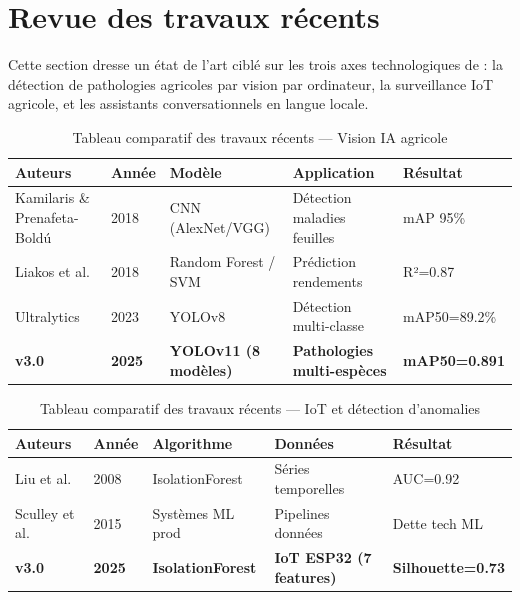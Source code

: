 \section{Revue des travaux récents}

Cette section dresse un état de l'art ciblé sur les trois axes technologiques de
\farmAI{} : la détection de pathologies agricoles par vision par ordinateur,
la surveillance IoT agricole, et les assistants conversationnels en langue locale.

\begin{table}[H]\centering
\caption{Tableau comparatif des travaux récents — Vision IA agricole}
\label{tab:art_vision}
\small
\begin{tabular}{p{3.5cm}p{2cm}p{2.5cm}p{3cm}p{2.5cm}}
\toprule
\textbf{Auteurs} & \textbf{Année} & \textbf{Modèle} & \textbf{Application} & \textbf{Résultat} \\
\midrule
Kamilaris \& Prenafeta-Boldú \cite{kamilaris2018deep} & 2018 & CNN (AlexNet/VGG) & Détection maladies feuilles & mAP 95\% \\
Liakos et al. \cite{liakos2018machine} & 2018 & Random Forest / SVM & Prédiction rendements & R²=0.87 \\
Ultralytics \cite{ultralytics2023yolov8} & 2023 & YOLOv8 & Détection multi-classe & mAP50=89.2\% \\
\textbf{\farmAI{} v3.0} & \textbf{2025} & \textbf{YOLOv11 (8 modèles)} & \textbf{Pathologies multi-espèces} & \textbf{mAP50=0.891} \\
\bottomrule
\end{tabular}
\end{table}

\begin{table}[H]\centering
\caption{Tableau comparatif des travaux récents — IoT et détection d'anomalies}
\label{tab:art_iot}
\small
\begin{tabular}{p{3.5cm}p{2cm}p{2.5cm}p{3cm}p{2.5cm}}
\toprule
\textbf{Auteurs} & \textbf{Année} & \textbf{Algorithme} & \textbf{Données} & \textbf{Résultat} \\
\midrule
Liu et al. \cite{liu2008isolation} & 2008 & IsolationForest & Séries temporelles & AUC=0.92 \\
Sculley et al. \cite{sculley2015hidden} & 2015 & Systèmes ML prod & Pipelines données & Dette tech ML \\
\textbf{\farmAI{} v3.0} & \textbf{2025} & \textbf{IsolationForest} & \textbf{IoT ESP32 (7 features)} & \textbf{Silhouette=0.73} \\
\bottomrule
\end{tabular}
\end{table}


